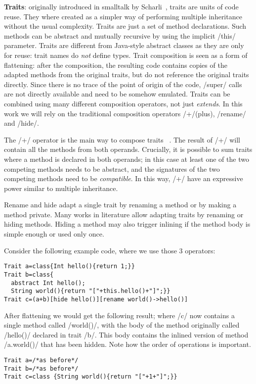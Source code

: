 \textbf{Traits}: originally introduced in smalltalk by Scharli~\cite{scharli2003traits}, traits are 
units of code reuse. They where created as a simpler way of performing multiple inheritance without the usual complexity.
Traits are just a set of method declarations.
Such methods can be abstract and
mutually recursive by using the implicit /this/ parameter.
Traits are different from Java-style abstract classes as
they are only for reuse: trait names do \emph{not} define types.
Trait composition is seen as a form of flattening: after the composition, the resulting code contains copies of the adapted methods from the original traits, but do not reference the original traits directly. Since there is no trace of
the point of origin of the code, /super/ calls are not 
directly available and need to be somehow emulated.
Traits can be combined using many different composition operators, not just \emph{extends}.
In this work we will rely on the traditional composition operators /+/(plus), /rename/ and /hide/.

The /+/ operator is the main way to compose traits
~\cite{scharli2003traits,LagorioSZ09}.
The result of /+/ will contain all the methods from both operands. 
Crucially, it is possible to sum traits where a method is declared in both operands; in this case at least one of the two competing methods needs to be abstract, and the signatures of the two competing methods need to be \emph{compatible}.
In this way, /+/ have an expressive power similar to multiple inheritance.

Rename and hide adapt a single trait by renaming a method or by making a method private.
Many works in literature allow adapting traits by renaming or hiding methods\cite{servetto2014meta,reppy2007metaprogramming,liquori2008feathertrait}. Hiding a method may also trigger inlining if the method body is simple enough or used only once.


Consider the following example code, where we use those 3 operators:
\begin{lstlisting}
Trait a=class{Int hello(){return 1;}}
Trait b=class{
  abstract Int hello();
  String world(){return "["+this.hello()+"]";}}
Trait c=(a+b)[hide hello()][rename world()->hello()]
\end{lstlisting}
After flattening we would get the following result; where /c/ now contains a single method called
/world()/, with the body of the method originally called /hello()/ declared in trait /b/. This body contains the
inlined version of method /a.world()/ that has been hidden.
Note how the order of operations is important.
\begin{lstlisting}
Trait a=/*as before*/
Trait b=/*as before*/
Trait c=class {String world(){return "["+1+"]";}}
\end{lstlisting}

